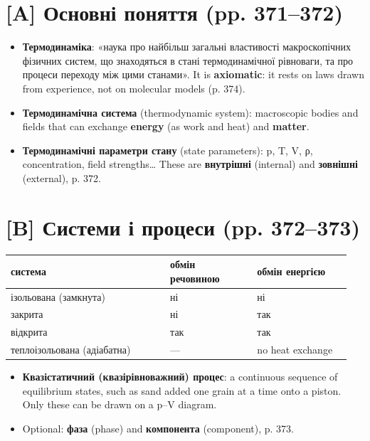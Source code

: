 \documentclass[11pt,a4paper,oneside]{book}
\begin{document}
\section*{[A] Основні поняття (pp. 371–372)}
\begin{itemize}
\item \textbf{Термодинаміка}: «наука про найбільш загальні властивості макроскопічних фізичних систем, що знаходяться в стані термодинамічної рівноваги, та про процеси переходу між цими станами». It is \textbf{axiomatic}: it rests on laws drawn from experience, not on molecular models (p. 374).
\item \textbf{Термодинамічна система} (thermodynamic system): macroscopic bodies and fields that can exchange \textbf{energy} (as work and heat) and \textbf{matter}.
\item \textbf{Термодинамічні параметри стану} (state parameters): p, T, V, ρ, concentration, field strengths… These are \textbf{внутрішні} (internal) and \textbf{зовнішні} (external), p. 372.
\end{itemize}

\section*{[B] Системи і процеси (pp. 372–373)}
{\small
\begin{longtable}{>{\raggedright\arraybackslash}p{0.443\linewidth}>{\raggedright\arraybackslash}p{0.246\linewidth}>{\raggedright\arraybackslash}p{0.263\linewidth}}
\toprule
\textbf{система} & \textbf{обмін речовиною} & \textbf{обмін енергією} \\
\midrule
\endhead
ізольована (замкнута) & ні & ні \\
закрита & ні & так \\
відкрита & так & так \\
теплоізольована (адіабатна) & — & no heat exchange \\
\bottomrule
\end{longtable}
}
\begin{itemize}
\item \textbf{Квазістатичний (квазірівноважний) процес}: a continuous sequence of equilibrium states, such as sand added one grain at a time onto a piston. Only these can be drawn on a p–V diagram.
\item Optional: \textbf{фаза} (phase) and \textbf{компонента} (component), p. 373.
\end{itemize}
\end{document}
